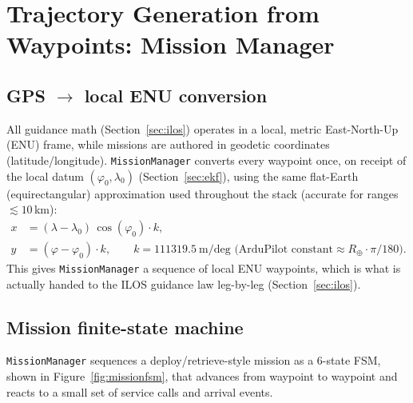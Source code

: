 \section{Trajectory Generation from Waypoints: Mission Manager}
\label{sec:mission}

\subsection{GPS $\to$ local ENU conversion}
\label{sec:gps2enu}

All guidance math (Section~\ref{sec:ilos}) operates in a local, metric East-North-Up (ENU) frame, while missions are authored in geodetic coordinates (latitude/longitude). \texttt{MissionManager} converts every waypoint once, on receipt of the local datum $(\varphi_0,\lambda_0)$ (Section~\ref{sec:ekf}), using the same flat-Earth (equirectangular) approximation used throughout the stack (accurate for ranges $\lesssim 10$\,km):
\begin{align}
x &= (\lambda - \lambda_0)\,\cos(\varphi_0)\cdot k, \\
y &= (\varphi - \varphi_0)\cdot k, \qquad k = 111319.5\ \text{m/deg (ArduPilot constant} \approx R_\oplus\cdot\pi/180).
\end{align}
This gives \texttt{MissionManager} a sequence of local ENU waypoints, which is what is actually handed to the ILOS guidance law leg-by-leg (Section~\ref{sec:ilos}).

\subsection{Mission finite-state machine}

\texttt{MissionManager} sequences a deploy/retrieve-style mission as a 6-state FSM, shown in Figure~\ref{fig:missionfsm}, that advances from waypoint to waypoint and reacts to a small set of service calls and arrival events.

